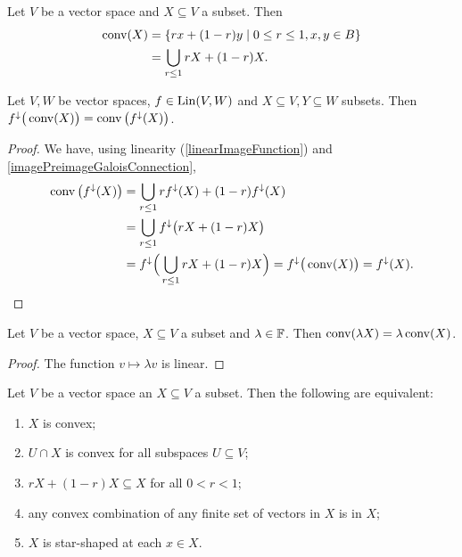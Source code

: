 \begin{lemma} \label{convexHullLemma}
Let $V$ be a vector space and $X\subseteq V$ a subset. Then 
\begin{align*}
\convex(X) &= \setbuilder{rx + (1-r)y}{0\leq r \leq 1, x,y\in B} \\
&= \bigcup_{r\leq 1} rX + (1-r)X.
\end{align*}
\end{lemma}
\begin{corollary} \label{linearFunctionsPreserveConvexHull}
Let $V,W$ be vector spaces, $f\in \operatorname{Lin}(V,W)$ and $X\subseteq V, Y\subseteq W$ subsets. Then $f^\downarrow\big(\operatorname{conv}(X)\big) = \operatorname{conv}\big(f^\downarrow(X)\big)$.
\end{corollary}
\begin{proof}
We have, using linearity (\ref{linearImageFunction}) and \ref{imagePreimageGaloisConnection},
\begin{align*}
\operatorname{conv}\big(f^\downarrow(X)\big) &= \bigcup_{r\leq 1}rf^{\downarrow}(X) + (1-r)f^\downarrow(X) \\
&= \bigcup_{r\leq 1}f^{\downarrow}\big(rX + (1-r)X\big) \\
&= f^{\downarrow}\Big(\bigcup_{r\leq 1}rX + (1-r)X\Big) = f^{\downarrow}\big(\operatorname{conv}(X)\big) = f^{\downarrow}(X).
\end{align*}
\end{proof}
\begin{corollary} \label{convexHullHomogeneous}
Let $V$ be a vector space, $X\subseteq V$ a subset and $\lambda\in \mathbb{F}$. Then $\operatorname{conv}(\lambda X) = \lambda \operatorname{conv}(X)$.
\end{corollary}
\begin{proof}
The function $v\mapsto \lambda v$ is linear.
\end{proof}

\begin{lemma} \label{convexCriteria}
Let $V$ be a vector space an $X\subseteq V$ a subset. Then the following are equivalent:
\begin{enumerate}
\item $X$ is convex;
\item $U\cap X$ is convex for all subspaces $U\subseteq V$;
\item $rX + (1-r)X \subseteq X$ for all $0< r < 1$;
\item any convex combination of any finite set of vectors in $X$ is in $X$;
\item $X$ is star-shaped at each $x\in X$.
\end{enumerate}
\end{lemma}

